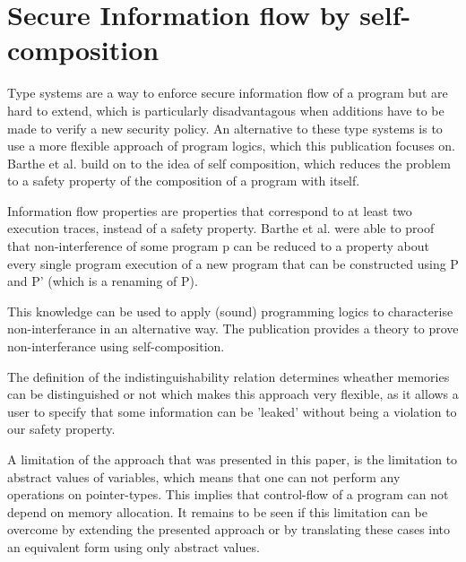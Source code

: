 \documentclass[a4paper,UKenglish]{lipics-v2018}
\begin{document}



\newpage
\section{Secure Information flow by self-composition}

Type systems are a way to enforce secure information flow of a program but are hard to extend, which is particularly disadvantagous when additions have to be made to verify a new security policy. An alternative to these type systems is to use a more flexible approach of program logics, which this publication focuses on. Barthe et al. build on to the idea of self composition, which reduces the problem to a safety property of the composition of a program with itself.\cite{information_flow_by_self_composition}

Information flow properties are properties that correspond to at least two execution traces, instead of a safety property. Barthe et al. were able to proof that non-interference of some program p can be reduced to a property about every single program execution of a new program that can be constructed using P and P' (which is a renaming of P).\cite{information_flow_by_self_composition}

This knowledge can be used to apply (sound) programming logics to characterise non-interferance in an alternative way. The publication provides a theory to prove non-interferance using self-composition.

The definition of the indistinguishability relation determines wheather memories can be distinguished or not which makes this approach very flexible, as it allows a user to specify that some information can be 'leaked' without being a violation to our safety property.\cite{information_flow_by_self_composition}

A limitation of the approach that was presented in this paper, is the limitation to abstract values of variables\cite{information_flow_by_self_composition}, which means that one can not perform any operations on pointer-types. This implies that control-flow of a program can not depend on memory allocation. It remains to be seen if this limitation can be overcome by extending the presented approach or by translating these cases into an equivalent form using only abstract values.
\end{document}

